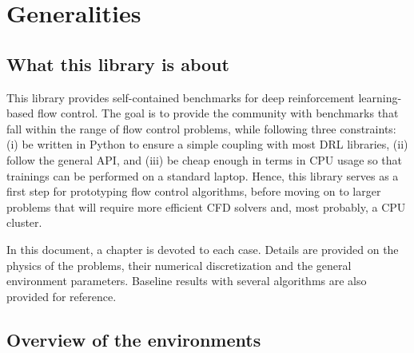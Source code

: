 \chapter{Generalities}

\section{What this library is about}

This library provides self-contained benchmarks for deep reinforcement learning-based flow control. The goal is to provide the community with benchmarks that fall within the range of flow control problems, while following three constraints: (i) be written in Python to ensure a simple coupling with most DRL libraries, (ii) follow the general \gym API, and (iii) be cheap enough in terms in CPU usage so that trainings can be performed on a standard laptop. Hence, this library serves as a first step for prototyping flow control algorithms, before moving on to larger problems that will require more efficient CFD solvers and, most probably, a CPU cluster.

In this document, a chapter is devoted to each case. Details are provided on the physics of the problems, their numerical discretization and the general environment parameters. Baseline results with several algorithms are also provided for reference.

\section{Overview of the environments}

